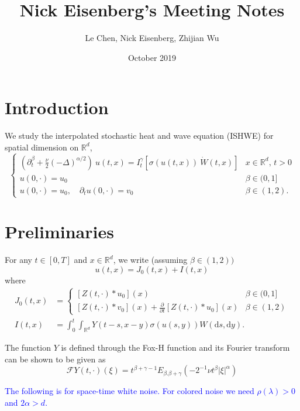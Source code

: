 \documentclass[a4paper,11pt]{article}
\title{Nick Eisenberg's Meeting Notes}
\author{Le Chen, Nick Eisenberg, Zhijian Wu}
\date{October 2019}
\numberwithin{equation}{section}
\theoremstyle{plain}
\theoremstyle{definition}
\newcommand{\ud}{\ensuremath{\mathrm{d} }}
\newcommand{\R}{\mathbb{R}}
\numberwithin{NQ}{section}
\numberwithin{LQ}{section}
\numberwithin{ZQ}{section}
\begin{document}
	\section{Introduction}
	We study the interpolated stochastic heat and wave equation (ISHWE) for spatial dimension on $\R^d$,
	\begin{equation}
	\label{E:SPDE}
	\begin{cases}
	\left(\partial^\beta_t + \frac{\nu}{2}(-\Delta)^{\alpha/2}\right)\: u(t,x) = I^\gamma_t \left[\sigma( u(t,x)) \: \dot W(t,x) \right] & \text{$x\in \R^d$, $t>0$} \\
	u(0,\cdot) = u_0                                                                                                            & \beta \in (0,1]               \\
	u(0,\cdot) = u_0, \quad \partial_t u(0,\cdot) = v_0                                                                            & \beta \in (1,2).
	\end{cases}
	\end{equation}
	
	
	\section{Preliminaries}
For any $t \in [0,T]$ and $x \in \R^d$, we write (assuming $\beta \in (1,2))$
\[
u(t,x) = J_0(t,x) + I(t,x)
\]
	where
	\begin{align*}
	J_0(t,x) &=\begin{cases} 
	[Z(t,\cdot)*u_0](x) & \beta \in (0,1]
	\\	[Z(t,\cdot)*v_0](x) + \frac{\partial}{\partial t}[Z(t,\cdot)*u_0](x) & \beta \in (1,2)
	\end{cases}
	\\	I(t,x) &= \int_0^t \int_{\R^d} Y(t-s,x-y)\sigma(u(s,y)) W(\ud s, \ud y).
	\end{align*}

The function $Y$ is defined through the Fox-H function and its Fourier transform can be shown to be given as 
	\[
		\mathcal{F}Y(t,\cdot)(\xi) = t^{\beta + \gamma-1}E_{\beta. \beta +\gamma}(-2^{-1}\nu t^\beta |\xi|^\alpha)
	\]
	
	\textcolor{blue}{The following is for space-time white noise. For colored noise we need $\rho(\lambda) >0$ and $2\alpha > d$.}
	
\end{document}
